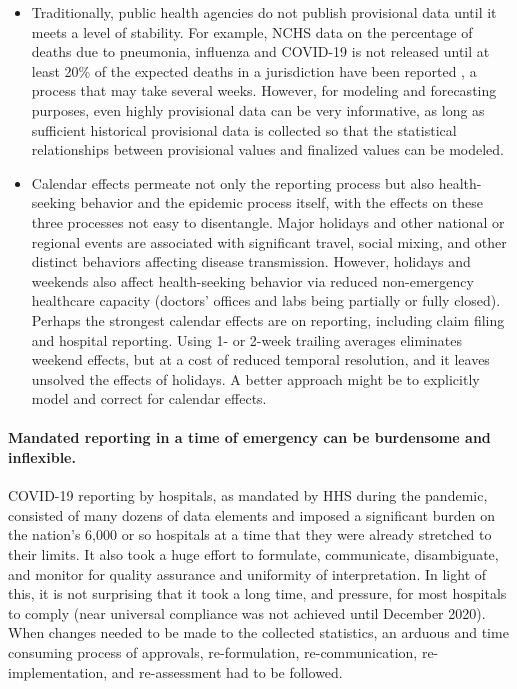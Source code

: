 \documentclass{article}
\begin{document}
\begin{itemize}
\item Traditionally, public health agencies do not publish provisional data
  until it meets a level of stability.  For example, NCHS data on the percentage
  of deaths due to pneumonia, influenza and COVID-19 is not released until at
  least 20\% of the expected deaths in a jurisdiction have been reported
  \citep{PIMortality}, a process that may take several weeks.  However, for
  modeling and forecasting purposes, even highly provisional data can be very 
  informative, as long as sufficient historical provisional data is collected so
  that the statistical relationships between provisional values and finalized
  values can be modeled. 

\item Calendar effects permeate not only the reporting process but also
  health-seeking behavior and the epidemic process itself, with the effects on
  these three processes not easy to disentangle.  Major holidays and other
  national or regional events are associated with significant travel, social
  mixing, and other distinct behaviors affecting disease transmission.  However,
  holidays and weekends also affect health-seeking behavior via reduced
  non-emergency healthcare capacity (doctors' offices and labs being partially
  or fully closed).  Perhaps the strongest calendar effects are on reporting,
  including claim filing and hospital reporting.  Using 1- or 2-week trailing
  averages eliminates weekend effects, but at a cost of reduced temporal
  resolution, and it leaves unsolved the effects of holidays.  A better approach
  might be to explicitly model and correct for calendar effects. 
\end{itemize}

\paragraph{Mandated reporting in a time of emergency can be burdensome and
  inflexible.}

COVID-19 reporting by hospitals, as mandated by HHS during the pandemic,
consisted of many dozens of data elements and imposed a significant burden on
the nation's 6,000 or so hospitals at a time that they were already stretched to
their limits.  It also took a huge effort to formulate, communicate,
disambiguate, and monitor for quality assurance and uniformity of
interpretation.  In light of this, it is not surprising that it took a long
time, and pressure, for most hospitals to comply (near universal compliance was
not achieved until December 2020).  When changes needed to be made to the
collected statistics, an arduous and time consuming process of approvals,
re-formulation, re-communication, re-implementation, and re-assessment had to be
followed.  
\end{document}
